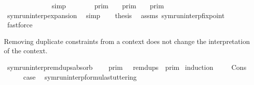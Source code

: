 \begin{isabellebody}
%
\endisadelimproof
%
\isatagproof
{}\isamarkupfalse%
\ {\isacharminus}\isanewline
\ \ \isamarkupfalse%
\ {\isacartoucheopen}{\isasymgamma}\ {\isacharhash}\ {\isasymGamma}\ {\isacharequal}\ {\isacharbrackleft}{\isasymgamma}{\isacharbrackright}\ {\isacharat}\ {\isasymGamma}{\isacartoucheclose}\ \isamarkupfalse%
\ simp\isanewline
\ \ \isamarkupfalse%
\ {\isacartoucheopen}{\isasymlbrakk}{\isasymlbrakk}\ {\isasymgamma}\ {\isacharhash}\ {\isasymGamma}\ {\isasymrbrakk}{\isasymrbrakk}\isactrlsub p\isactrlsub r\isactrlsub i\isactrlsub m\ {\isacharequal}\ {\isasymlbrakk}{\isasymlbrakk}\ {\isacharbrackleft}{\isasymgamma}{\isacharbrackright}\ {\isasymrbrakk}{\isasymrbrakk}\isactrlsub p\isactrlsub r\isactrlsub i\isactrlsub m\ {\isasyminter}\ {\isasymlbrakk}{\isasymlbrakk}\ {\isasymGamma}\ {\isasymrbrakk}{\isasymrbrakk}\isactrlsub p\isactrlsub r\isactrlsub i\isactrlsub m{\isacartoucheclose}\isanewline
\ \ \ \ \isamarkupfalse%
\ symrun{\isacharunderscore}interp{\isacharunderscore}expansion\ \isamarkupfalse%
\ simp\isanewline
\ \ \isamarkupfalse%
\ {\isacharquery}thesis\ \isamarkupfalse%
\ assms\ symrun{\isacharunderscore}interp{\isacharunderscore}fixpoint\ \isamarkupfalse%
\ fastforce\isanewline
{}\isamarkupfalse%
%
\endisatagproof
{\isafoldproof}%
%
\isadelimproof
%
\endisadelimproof
%
\begin{isamarkuptext}%
Removing duplicate constraints from a context does not change the
  interpretation of the context.%
\end{isamarkuptext}\isamarkuptrue%
\isamarkupfalse%
\ symrun{\isacharunderscore}interp{\isacharunderscore}remdups{\isacharunderscore}absorb{\isacharcolon}\isanewline
\ \ {\isacartoucheopen}{\isasymlbrakk}{\isasymlbrakk}\ {\isasymGamma}\ {\isasymrbrakk}{\isasymrbrakk}\isactrlsub p\isactrlsub r\isactrlsub i\isactrlsub m\ {\isacharequal}\ {\isasymlbrakk}{\isasymlbrakk}\ remdups\ {\isasymGamma}\ {\isasymrbrakk}{\isasymrbrakk}\isactrlsub p\isactrlsub r\isactrlsub i\isactrlsub m{\isacartoucheclose}\isanewline
%
\isadelimproof
%
\endisadelimproof
%
\isatagproof
{}\isamarkupfalse%
\ {\isacharparenleft}induction\ {\isasymGamma}{\isacharparenright}\isanewline
\ \ \isamarkupfalse%
\ Cons\isanewline
\ \ \ \ \isamarkupfalse%
\ {\isacharquery}case\ \isamarkupfalse%
\ symrun{\isacharunderscore}interp{\isacharunderscore}formula{\isacharunderscore}stuttering\ \isamarkupfalse%

\end{isabellebody}
